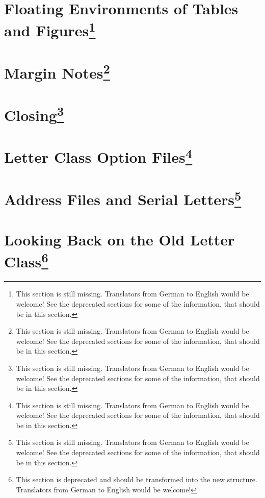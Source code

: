 \section{Floating Environments of Tables and Figures\protect\footnote{This section is still missing. Translators
    from German to English would be welcome! See the deprecated sections for
    some of the information, that should be in this section.}}
\label{sec:scrlttr2.stillmissing}
\mbox{}

\section{Margin Notes\protect\footnote{This section is still missing. Translators
    from German to English would be welcome! See the deprecated sections for
    some of the information, that should be in this section.}}
\label{sec:scrlttr2.stillmissing}
\mbox{}

\section{Closing\protect\footnote{This section is still missing. Translators
    from German to English would be welcome! See the deprecated sections for
    some of the information, that should be in this section.}}
\label{sec:scrlttr2.stillmissing}
\mbox{}

\section{Letter Class Option Files\protect\footnote{This section is still missing. Translators
    from German to English would be welcome! See the deprecated sections for
    some of the information, that should be in this section.}}
\label{sec:scrlttr2.stillmissing}
\mbox{}

\section{Address Files and Serial Letters\protect\footnote{This section is still missing. Translators
    from German to English would be welcome! See the deprecated sections for
    some of the information, that should be in this section.}}
\label{sec:scrlttr2.stillmissing}
\mbox{}


\section{Looking Back on the Old Letter Class\protect\footnote{This section is
  deprecated and should be transformed into the new structure. Translators
  from German to English would be welcome!}}
\label{sec:scrlttr2.scrlettr}

